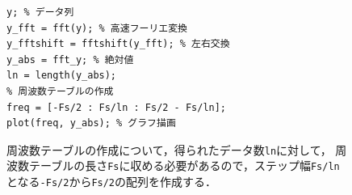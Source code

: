 \begin{figure}[h]
\begin{minipage}[b]{.48\textwidth}
        \centering
        \begin{lstlisting}[caption={振幅スペクトルの取得},label={src:振幅スペクトルの取得},xleftmargin={.5cm}]
y; % データ列
y_fft = fft(y); % 高速フーリエ変換
y_fftshift = fftshift(y_fft); % 左右交換
y_abs = fft_y; % 絶対値
ln = length(y_abs);
% 周波数テーブルの作成
freq = [-Fs/2 : Fs/ln : Fs/2 - Fs/ln];
plot(freq, y_abs); % グラフ描画
\end{lstlisting}
        \begin{flushleft}
            周波数テーブルの作成について，得られたデータ数\texttt{ln}に対して，
            周波数テーブルの長さ\texttt{Fs}に収める必要があるので，ステップ幅\texttt{Fs/ln}となる\texttt{-Fs/2}から\texttt{Fs/2}の配列を作成する．
        \end{flushleft}
    \end{minipage}
\end{figure}
